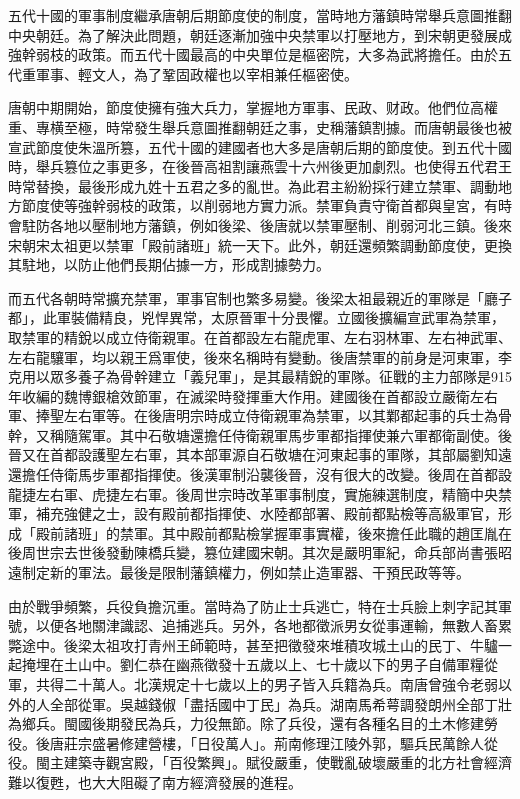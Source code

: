 五代十國的軍事制度繼承唐朝后期節度使的制度，當時地方藩鎮時常舉兵意圖推翻中央朝廷。為了解決此問題，朝廷逐漸加強中央禁軍以打壓地方，到宋朝更發展成強幹弱枝的政策。而五代十國最高的中央單位是樞密院，大多為武將擔任。由於五代重軍事、輕文人，為了鞏固政權也以宰相兼任樞密使。

唐朝中期開始，節度使擁有強大兵力，掌握地方軍事、民政、财政。他們位高權重、專横至極，時常發生舉兵意圖推翻朝廷之事，史稱藩鎮割據。而唐朝最後也被宣武節度使朱溫所篡，五代十國的建國者也大多是唐朝后期的節度使。到五代十國時，舉兵篡位之事更多，在後晉高祖割讓燕雲十六州後更加劇烈。也使得五代君王時常替換，最後形成九姓十五君之多的亂世。為此君主紛紛採行建立禁軍、調動地方節度使等強幹弱枝的政策，以削弱地方實力派。禁軍負責守衛首都與皇宮，有時會駐防各地以壓制地方藩鎮，例如後梁、後唐就以禁軍壓制、削弱河北三鎮。後來宋朝宋太祖更以禁軍「殿前諸班」統一天下。此外，朝廷還頻繁調動節度使，更換其駐地，以防止他們長期佔據一方，形成割據勢力。

而五代各朝時常擴充禁軍，軍事官制也繁多易變。後梁太祖最親近的軍隊是「廳子都」，此軍裝備精良，兇悍異常，太原晉軍十分畏懼。立國後擴編宣武軍為禁軍，取禁軍的精銳以成立侍衛親軍。在首都設左右龍虎軍、左右羽林軍、左右神武軍、左右龍驤軍，均以親王爲軍使，後來名稱時有變動。後唐禁軍的前身是河東軍，李克用以眾多養子為骨幹建立「義兒軍」，是其最精銳的軍隊。征戰的主力部隊是915年收編的魏博銀槍效節軍，在滅梁時發揮重大作用。建國後在首都設立嚴衛左右軍、捧聖左右軍等。在後唐明宗時成立侍衛親軍為禁軍，以其鄴都起事的兵士為骨幹，又稱隨駕軍。其中石敬塘還擔任侍衛親軍馬步軍都指揮使兼六軍都衛副使。後晉又在首都設護聖左右軍，其本部軍源自石敬塘在河東起事的軍隊，其部屬劉知遠還擔任侍衛馬步軍都指揮使。後漢軍制沿襲後晉，沒有很大的改變。後周在首都設龍捷左右軍、虎捷左右軍。後周世宗時改革軍事制度，實施練選制度，精簡中央禁軍，補充強健之士，設有殿前都指揮使、水陸都部署、殿前都點檢等高級軍官，形成「殿前諸班」的禁軍。其中殿前都點檢掌握軍事實權，後來擔任此職的趙匡胤在後周世宗去世後發動陳橋兵變，篡位建國宋朝。其次是嚴明軍紀，命兵部尚書張昭遠制定新的軍法。最後是限制藩鎮權力，例如禁止造軍器、干預民政等等。

由於戰爭頻繁，兵役負擔沉重。當時為了防止士兵逃亡，特在士兵臉上刺字記其軍號，以便各地關津識認、追捕逃兵。另外，各地都徵派男女從事運輸，無數人畜累斃途中。後梁太祖攻打青州王師範時，甚至把徵發來堆積攻城土山的民丁、牛驢一起掩埋在土山中。劉仁恭在幽燕徵發十五歲以上、七十歲以下的男子自備軍糧從軍，共得二十萬人。北漢規定十七歲以上的男子皆入兵籍為兵。南唐曾強令老弱以外的人全部從軍。吳越錢俶「盡括國中丁民」為兵。湖南馬希萼調發朗州全部丁壯為鄉兵。閩國後期發民為兵，力役無節。除了兵役，還有各種名目的土木修建勞役。後唐莊宗盛暑修建營樓，「日役萬人」。荊南修理江陵外郭，驅兵民萬餘人從役。閩主建築寺觀宮殿，「百役繁興」。賦役嚴重，使戰亂破壞嚴重的北方社會經濟難以復甦，也大大阻礙了南方經濟發展的進程。

